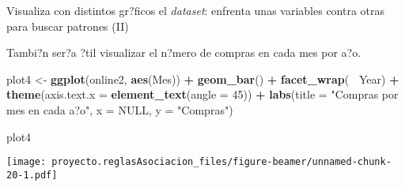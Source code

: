 \documentclass[
  ignorenonframetext,
]{beamer}
\newenvironment{Shaded}{\begin{snugshade}}{\end{snugshade}}
\newcommand{\DataTypeTok}[1]{\textcolor[rgb]{0.13,0.29,0.53}{#1}}
\newcommand{\DecValTok}[1]{\textcolor[rgb]{0.00,0.00,0.81}{#1}}
\newcommand{\KeywordTok}[1]{\textcolor[rgb]{0.13,0.29,0.53}{\textbf{#1}}}
\newcommand{\NormalTok}[1]{#1}
\newcommand{\OperatorTok}[1]{\textcolor[rgb]{0.81,0.36,0.00}{\textbf{#1}}}
\newcommand{\OtherTok}[1]{\textcolor[rgb]{0.56,0.35,0.01}{#1}}
\newcommand{\StringTok}[1]{\textcolor[rgb]{0.31,0.60,0.02}{#1}}
\begin{document}
\begin{frame}[fragile]{Visualiza con distintos gr?ficos el
\emph{dataset}: enfrenta unas variables contra otras para buscar
patrones (II)}
\protect\hypertarget{visualiza-con-distintos-grficos-el-dataset-enfrenta-unas-variables-contra-otras-para-buscar-patrones-ii}{}

Tambi?n ser?a ?til visualizar el n?mero de compras en cada mes por a?o.

\begin{Shaded}
\begin{Highlighting}[]
\NormalTok{plot4 <-}\StringTok{ }\KeywordTok{ggplot}\NormalTok{(online2, }\KeywordTok{aes}\NormalTok{(Mes)) }\OperatorTok{+}\StringTok{ }
\StringTok{  }\KeywordTok{geom_bar}\NormalTok{() }\OperatorTok{+}\StringTok{ }
\StringTok{  }\KeywordTok{facet_wrap}\NormalTok{(}\OperatorTok{~}\StringTok{ }\NormalTok{Year) }\OperatorTok{+}\StringTok{ }
\StringTok{  }\KeywordTok{theme}\NormalTok{(}\DataTypeTok{axis.text.x =} \KeywordTok{element_text}\NormalTok{(}\DataTypeTok{angle =} \DecValTok{45}\NormalTok{)) }\OperatorTok{+}
\StringTok{  }\KeywordTok{labs}\NormalTok{(}\DataTypeTok{title =} \StringTok{"Compras por mes en cada a?o"}\NormalTok{, }\DataTypeTok{x =} \OtherTok{NULL}\NormalTok{, }\DataTypeTok{y =} \StringTok{"Compras"}\NormalTok{)}

\NormalTok{plot4}
\end{Highlighting}
\end{Shaded}

\texttt{[image: proyecto.reglasAsociacion\_files/figure-beamer/unnamed-chunk-20-1.pdf]}

\end{frame}
\end{document}
